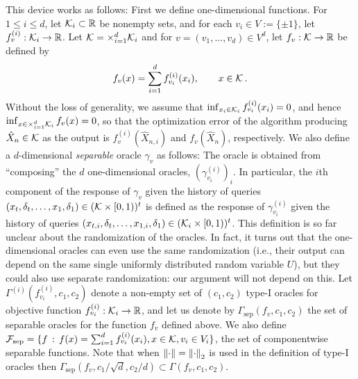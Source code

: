 This device works as follows: First we define one-dimensional functions.
For $1\le i \le d$, let $\mathcal{K}_i \subset \mathbb{R}$ be nonempty sets, 
and for each $v_i \in V := \{\pm 1\}$, let $f_v^{(i)}: \mathcal{K}_i \to \mathbb{R}$.
%
Let $\mathcal{K} = \times_{i=1}^d \mathcal{K}_i$ and for $v = (v_1,\dots,v_d) \in V^d$, let $f_v: \mathcal{K} \to \mathbb{R}$ be defined by
\begin{align}
f_v(x) = \sum_{i=1}^d f^{(i)}_{v_i}(x_i), \qquad x\in \mathcal{K}\,. \label{eq:sepfdef}
\end{align}
Without the loss of generality, we assume that $\inf_{x_i \in \mathcal{K}_i} f_{v_i}^{(i)}(x_i) = 0$, and hence $\inf_{x\in \times_{i=1}^d \mathcal{K}_i} f_{v}(x) = 0$, so that the optimization error of the algorithm producing $\hat{X}_n \in\mathcal{K}$  as the output is $f_v^{(i)}(\hat{X}_{n,i})$ and $f_v(\hat{X}_{n})$, respectively.
We also define a $d$-dimensional \emph{separable} oracle $\gamma_v$  as follows: 
The oracle  is obtained from ``composing'' the $d$ one-dimensional oracles, $(\gamma_{v_i}^{(i)})_{i}$.
In particular, the $i$th component of the response of $\gamma_v$ 
given the history of queries $(x_{t},\delta_{t},\dots,x_1,\delta_1)\in (\mathcal{K} \times [0,1))^t$
is defined as the response of $\gamma^{(i)}_{v_i}$ 
given the history of queries $(x_{t,i},\delta_{t},\dots,x_{1,i},\delta_1)\in (\mathcal{K}_i\times [0,1))^t$.
This definition is so far unclear about the randomization of the oracles. 
In fact, it turns out that the one-dimensional oracles can even use the same randomization (i.e.,
their output can depend on the same single uniformly distributed random variable $U$), but they could also use separate randomization: our argument will not depend on this.
\newcommand{\sep}{\mathrm{sep}}
Let $\Gamma^{(i)}(f_{v_i}^{(i)},c_1,c_2)$ 
denote a non-empty set of $(c_1,c_2)$ type-I oracles for objective function $f^{(i)}_{v_i}:\mathcal{K}_i \to \mathbb{R}$,
and let us denote by $\Gamma_\sep(f_v,c_1,c_2)$ the set of separable oracles for the function $f_v$ 
defined above.
We also define $\cF_\sep = \{ f\,: \, f(x) = \sum_{i=1}^d f^{(i)}_{v_i}(x_i), x\in \cK, v_i\in V_i \}$, the set of componentwise separable functions.
Note that when $\left\|\cdot\right\| = \left\|\cdot\right\|_2$ is used in the definition of type-I oracles then
$\Gamma_\sep(f_v,c_1/\sqrt{d},c_2/d) \subset \Gamma(f_v,c_1,c_2)$.


